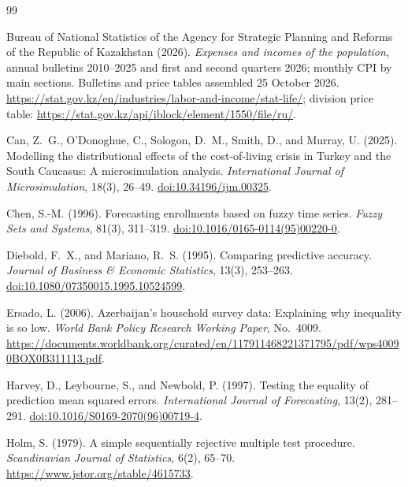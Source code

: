 \documentclass[11pt,a4paper]{article}
\begin{document}
\begin{thebibliography}{99}
\footnotesize\raggedright
\setlength{\bibsep}{2pt}
Bureau of National Statistics of the Agency for Strategic Planning and Reforms of the Republic of Kazakhstan (2026).
\emph{Expenses and incomes of the population}, annual bulletins 2010--2025 and first and second quarters 2026; monthly CPI by main sections.
Bulletins and price tables assembled 25 October 2026.
\url{https://stat.gov.kz/en/industries/labor-and-income/stat-life/};
division price table: \url{https://stat.gov.kz/api/iblock/element/1550/file/ru/}.

Can, Z.~G., O'Donoghue, C., Sologon, D.~M., Smith, D., and Murray, U. (2025).
Modelling the distributional effects of the cost-of-living crisis in Turkey and the South Caucasus: A microsimulation analysis.
\emph{International Journal of Microsimulation}, 18(3), 26--49.
\href{https://doi.org/10.34196/ijm.00325}{doi:10.34196/ijm.00325}.

Chen, S.-M. (1996). Forecasting enrollments based on fuzzy time series.
\emph{Fuzzy Sets and Systems}, 81(3), 311--319.
\href{https://doi.org/10.1016/0165-0114(95)00220-0}{doi:10.1016/0165-0114(95)00220-0}.

Diebold, F.~X., and Mariano, R.~S. (1995). Comparing predictive accuracy.
\emph{Journal of Business \& Economic Statistics}, 13(3), 253--263.
\href{https://doi.org/10.1080/07350015.1995.10524599}{doi:10.1080/07350015.1995.10524599}.

Ersado, L. (2006). Azerbaijan's household survey data: Explaining why inequality is so low.
\emph{World Bank Policy Research Working Paper}, No.~4009.
\url{https://documents.worldbank.org/curated/en/117911468221371795/pdf/wps40090BOX0B311113.pdf}.

Harvey, D., Leybourne, S., and Newbold, P. (1997).
Testing the equality of prediction mean squared errors.
\emph{International Journal of Forecasting}, 13(2), 281--291.
\href{https://doi.org/10.1016/S0169-2070(96)00719-4}{doi:10.1016/S0169-2070(96)00719-4}.

Holm, S. (1979). A simple sequentially rejective multiple test procedure.
\emph{Scandinavian Journal of Statistics}, 6(2), 65--70.
\url{https://www.jstor.org/stable/4615733}.


\end{thebibliography}
\end{document}
